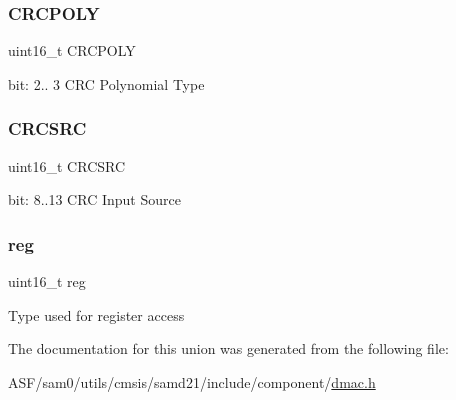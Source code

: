 \subsubsection{\texorpdfstring{CRCPOLY}{CRCPOLY}}
{\footnotesize\ttfamily uint16\+\_\+t C\+R\+C\+P\+O\+LY}

bit\+: 2.. 3 C\+RC Polynomial Type \mbox{\label{union_d_m_a_c___c_r_c_c_t_r_l___type_abeeb55aaaf54e9bb28517d6341d2770f}} 
\subsubsection{\texorpdfstring{CRCSRC}{CRCSRC}}
{\footnotesize\ttfamily uint16\+\_\+t C\+R\+C\+S\+RC}

bit\+: 8..13 C\+RC Input Source \mbox{\label{union_d_m_a_c___c_r_c_c_t_r_l___type_a11760f5020019f4aa8cb02e694f7cc44}} 
\subsubsection{\texorpdfstring{reg}{reg}}
{\footnotesize\ttfamily uint16\+\_\+t reg}

Type used for register access 

The documentation for this union was generated from the following file\+:\begin{DoxyCompactItemize}
\item 
A\+S\+F/sam0/utils/cmsis/samd21/include/component/\mbox{\hyperlink{component_2dmac_8h}{dmac.\+h}}\end{DoxyCompactItemize}
